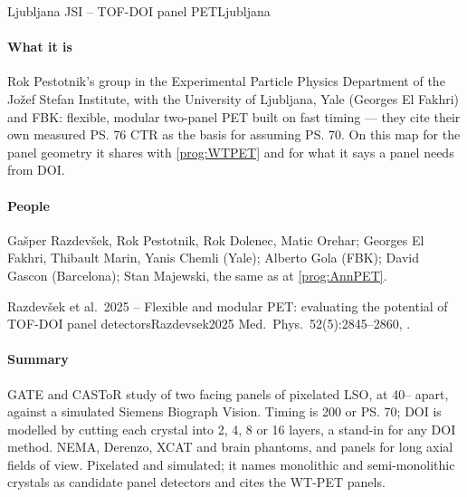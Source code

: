 \begin{programnote}{Ljubljana JSI -- TOF-DOI panel PET}{Ljubljana}

\paragraph{What it is}
Rok Pestotnik's group in the Experimental Particle Physics Department of the
Jožef Stefan Institute, with the University of Ljubljana, Yale (Georges El
Fakhri) and FBK: flexible, modular two-panel PET built on fast timing --- they
cite their own measured \ps{76} CTR as the basis for assuming \ps{70}. On this map for
the panel geometry it shares with \ref{prog:WTPET} and for what it says a
panel needs from DOI.

\paragraph{People}
Gašper Razdevšek, Rok Pestotnik, Rok Dolenec, Matic Orehar; Georges El Fakhri,
Thibault Marin, Yanis Chemli (Yale); Alberto Gola (FBK); David Gascon
(Barcelona); Stan Majewski, the same as at \ref{prog:AnnPET}.

\begin{papernote}{Razdevšek et al.\ 2025 -- Flexible and modular PET: evaluating the potential of TOF-DOI panel detectors}{Razdevsek2025}
Med.\ Phys.\ 52(5):2845--2860, .

\paragraph{Summary}
GATE and CASToR study of two facing  panels of
pixelated  LSO, at 40-- apart, against a
simulated Siemens Biograph Vision. Timing is 200 or \ps{70}; DOI is modelled by
cutting each crystal into 2, 4, 8 or 16 layers, a stand-in for any DOI method.
NEMA, Derenzo, XCAT and brain phantoms, and  panels for
long axial fields of view. Pixelated and simulated; it names monolithic and
semi-monolithic crystals as candidate panel detectors and cites the WT-PET
panels.


\end{papernote}
\end{programnote}
